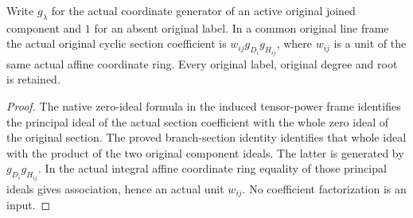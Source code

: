 \begin{lemma}
\label{lem:kn-adapted-original-coefficients}
\leanok
{}
Write $g_\lambda$ for the actual coordinate generator of an active original
joined component and $1$ for an absent original label.  In a common original
line frame the actual original cyclic section coefficient is
$w_{ij}g_{D_i}g_{H_{ij}}$, where $w_{ij}$ is a unit of the same actual affine
coordinate ring.  Every original label, original degree and root is retained.
\end{lemma}
\begin{proof}
The native zero-ideal formula in the induced tensor-power frame identifies
the principal ideal of the actual section coefficient with the whole zero
ideal of the original section.  The proved branch-section identity identifies
that whole ideal with the product of the two original component ideals.
The latter is generated by $g_{D_i}g_{H_{ij}}$.  In the actual integral affine
coordinate ring equality of those principal ideals gives association, hence
an actual unit $w_{ij}$.  No coefficient factorization is an input.
\end{proof}

